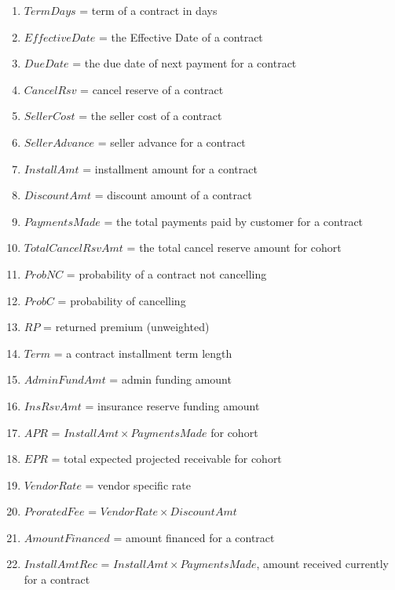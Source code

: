 \documentclass[titlepage]{article}
\begin{document}
\begin{enumerate}
	\item $TermDays$ = term of a contract in days
	\item $EffectiveDate$ = the Effective Date of a contract
	\item $DueDate$ = the due date of next payment for a contract
	\item $CancelRsv$ = cancel reserve of a contract
	\item $SellerCost$ = the seller cost of a contract
	\item $SellerAdvance$ = seller advance for a contract
	\item $InstallAmt$ = installment amount for a contract
	\item $DiscountAmt$ = discount amount of a contract
	\item $PaymentsMade$ = the total payments paid by customer for a contract
	\item $TotalCancelRsvAmt$ = the total cancel reserve amount for cohort
	\item $ProbNC$ = probability of a contract not cancelling
	\item $ProbC$ = probability of cancelling
	\item $RP$ = returned premium (unweighted)
	\item $Term$ = a contract installment term length
	\item $AdminFundAmt$ = admin funding amount
	\item $InsRsvAmt$ = insurance reserve funding amount
	\item $APR$ = $InstallAmt \times PaymentsMade$ for cohort
	\item $EPR$ = total expected projected receivable for cohort
	\item $VendorRate$ = vendor specific rate
	\item $ProratedFee$ = $VendorRate \times DiscountAmt$
	\item $AmountFinanced$ = amount financed for a contract
	\item $InstallAmtRec$ = $InstallAmt \times PaymentsMade$, amount received currently for a contract
\end{enumerate}
\end{document}
